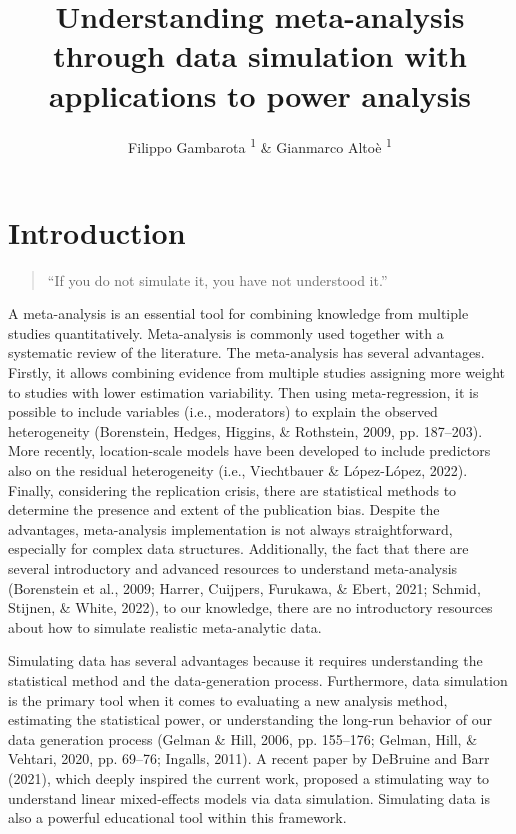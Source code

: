 \documentclass[
  man,floatsintext]{apa6}
\title{Understanding meta-analysis through data simulation with applications to power analysis}
\author{Filippo Gambarota \orcidlink{0000-0002-6666-1747}\textsuperscript{1} \& Gianmarco Altoè \orcidlink{0000-0003-1154-9528}\textsuperscript{1}}
\date{}
\affiliation{\vspace{0.5cm}\textsuperscript{1} Department of Developmental and Social Psychology, University of Padova, Italy}
\begin{document}
\maketitle

\setcounter{secnumdepth}{5}

\section{Introduction}\label{introduction}

\begin{quote}
``If you do not simulate it, you have not understood it.''
\end{quote}

A meta-analysis is an essential tool for combining knowledge from multiple studies quantitatively. Meta-analysis is commonly used together with a systematic review of the literature. The meta-analysis has several advantages. Firstly, it allows combining evidence from multiple studies assigning more weight to studies with lower estimation variability. Then using meta-regression, it is possible to include variables (i.e., moderators) to explain the observed heterogeneity (Borenstein, Hedges, Higgins, \& Rothstein, 2009, pp. 187--203). More recently, location-scale models have been developed to include predictors also on the residual heterogeneity (i.e., Viechtbauer \& López-López, 2022). Finally, considering the replication crisis, there are statistical methods to determine the presence and extent of the publication bias. Despite the advantages, meta-analysis implementation is not always straightforward, especially for complex data structures. Additionally, the fact that there are several introductory and advanced resources to understand meta-analysis (Borenstein et al., 2009; Harrer, Cuijpers, Furukawa, \& Ebert, 2021; Schmid, Stijnen, \& White, 2022), to our knowledge, there are no introductory resources about how to simulate realistic meta-analytic data.

Simulating data has several advantages because it requires understanding the statistical method and the data-generation process. Furthermore, data simulation is the primary tool when it comes to evaluating a new analysis method, estimating the statistical power, or understanding the long-run behavior of our data generation process (Gelman \& Hill, 2006, pp. 155--176; Gelman, Hill, \& Vehtari, 2020, pp. 69--76; Ingalls, 2011). A recent paper by DeBruine and Barr (2021), which deeply inspired the current work, proposed a stimulating way to understand linear mixed-effects models via data simulation. Simulating data is also a powerful educational tool within this framework.
\end{document}
